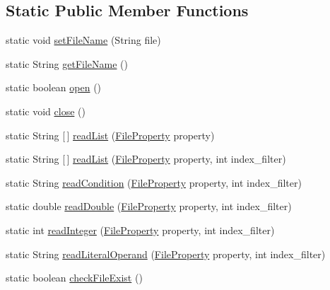 \subsection*{Static Public Member Functions}
\begin{DoxyCompactItemize}
\item 
static void \hyperlink{classutilities_1_1_data_file_a03d4af9888db5dfd5031fd3ead4964bf}{set\+File\+Name} (String file)
\item 
static String \hyperlink{classutilities_1_1_data_file_ae5e95d9019f786414f891e2afc966381}{get\+File\+Name} ()
\item 
static boolean \hyperlink{classutilities_1_1_data_file_aa53fb6327a320f458fd8314751e241c9}{open} ()
\item 
static void \hyperlink{classutilities_1_1_data_file_a4f113f0a5f50902308585d1f11988ec7}{close} ()
\item 
static String \mbox{[}$\,$\mbox{]} \hyperlink{classutilities_1_1_data_file_a68332bb2b70bafbaae007d952ba4264b}{read\+List} (\hyperlink{enumutilities_1_1_file_property}{File\+Property} property)
\item 
static String \mbox{[}$\,$\mbox{]} \hyperlink{classutilities_1_1_data_file_a86acc1699af206a96ab51c94d6663afe}{read\+List} (\hyperlink{enumutilities_1_1_file_property}{File\+Property} property, int index\+\_\+filter)
\item 
static String \hyperlink{classutilities_1_1_data_file_ae44a128705ef07c67393153806fb5216}{read\+Condition} (\hyperlink{enumutilities_1_1_file_property}{File\+Property} property, int index\+\_\+filter)
\item 
static double \hyperlink{classutilities_1_1_data_file_aafa9fbee5003c8d9abcd0b02ba4b31dc}{read\+Double} (\hyperlink{enumutilities_1_1_file_property}{File\+Property} property, int index\+\_\+filter)
\item 
static int \hyperlink{classutilities_1_1_data_file_a7576f90d40db372f262216f8f6a64c28}{read\+Integer} (\hyperlink{enumutilities_1_1_file_property}{File\+Property} property, int index\+\_\+filter)
\item 
static String \hyperlink{classutilities_1_1_data_file_adb4c1c9272d3497615385f4f8278ab60}{read\+Literal\+Operand} (\hyperlink{enumutilities_1_1_file_property}{File\+Property} property, int index\+\_\+filter)
\item 
static boolean \hyperlink{classutilities_1_1_data_file_a28beb850c6cc447aa7757e9f3967224c}{check\+File\+Exist} ()
\end{DoxyCompactItemize}

